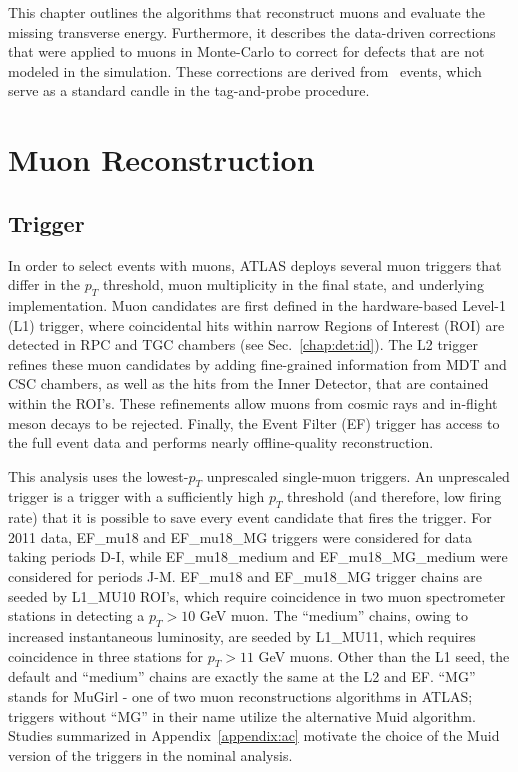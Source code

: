 
This chapter outlines the algorithms that reconstruct muons and evaluate the missing transverse energy. Furthermore, it describes the data-driven corrections that were applied to muons in Monte-Carlo to correct for defects that are not modeled in the simulation. These corrections are derived from \Zmm\ events, which serve as a standard candle in the tag-and-probe procedure.

\section{Muon Reconstruction}
\label{sec:event:muonperf}

\subsection{Trigger}
\label{sec:event:trig}
In order to select events with muons, ATLAS deploys several muon triggers that differ in the $p_T$ threshold, muon multiplicity in the final state, and underlying implementation. Muon candidates are first defined in the hardware-based Level-1 (L1) trigger, where coincidental hits within narrow Regions of Interest (ROI) are detected in RPC and TGC chambers (see Sec.~\ref{chap:det:id}). The L2 trigger refines these muon candidates by adding fine-grained information from MDT and CSC chambers, as well as the hits from the Inner Detector, that are contained within the ROI's. These refinements allow muons from cosmic rays and in-flight meson decays to be rejected. Finally, the Event Filter (EF) trigger has access to the full event data and performs nearly offline-quality reconstruction.

This analysis uses the lowest-$p_T$ unprescaled single-muon triggers. An unprescaled trigger is a trigger with a sufficiently high $p_T$ threshold (and therefore, low firing rate) that it is possible to save every event candidate that fires the trigger. For 2011 data, EF\_mu18 and EF\_mu18\_MG triggers were considered for data taking periods D-I, while EF\_mu18\_medium and EF\_mu18\_MG\_medium were considered for periods J-M. EF\_mu18 and EF\_mu18\_MG trigger chains are seeded by L1\_MU10 ROI's, which require coincidence in two muon spectrometer stations in detecting a $p_T>10$ GeV muon. The ``medium'' chains, owing to increased instantaneous luminosity, are seeded by L1\_MU11, which requires coincidence in three stations for $p_T>11$ GeV muons. Other than the L1 seed, the default and ``medium'' chains are exactly the same at the L2 and EF. ``MG'' stands for MuGirl - one of two muon reconstructions algorithms in ATLAS; triggers without ``MG'' in their name utilize the alternative Muid algorithm. Studies summarized in Appendix~\ref{appendix:ac} motivate the choice of the Muid version of the triggers in the nominal analysis.

